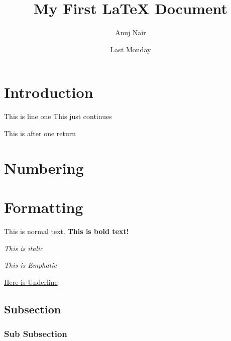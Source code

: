 \documentclass{article}
\author{Anuj Nair}
\title{My First {\LaTeX} Document}
\date{Last Monday}
\begin{document}
\maketitle


\section{Introduction}

This is line one
This just continues

This is after one return  


\section{Numbering}

\section{Formatting}

This is normal text. \textbf{This is bold text!}

\textit{This is italic}

\emph{This is Emphatic}

\underline{Here is Underline}

\subsection{Subsection}
\subsubsection{Sub Subsection}
\end{document}
